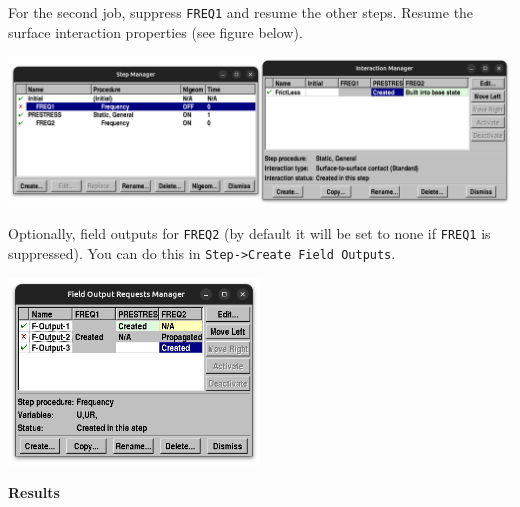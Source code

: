 \documentclass[11pt]{article}
\begin{document}
\begin{enumerate}
\begin{center}
\end{center}
For the second job, suppress \texttt{FREQ1} and resume the other steps. Resume the surface interaction properties (see figure below).
\begin{center}
\includegraphics[width=.9\linewidth]{./figs/run2.png}
\end{center}
Optionally, field outputs for \texttt{FREQ2} (by default it will be set to none if \texttt{FREQ1} is suppressed).
You can do this in \texttt{Step->Create Field Outputs}.
\begin{center}
\includegraphics[width=0.5\textwidth]{./figs/run2_fo.png}
\end{center}
\end{enumerate}
\textbf{Results}
\end{document}
